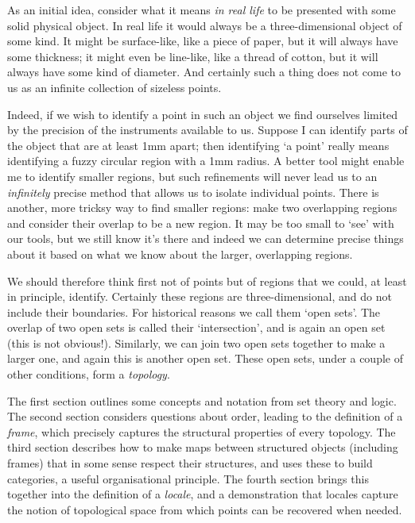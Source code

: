 \documentclass[oneside,english]{amsbook}
\numberwithin{section}{chapter}
\theoremstyle{plain}
\theoremstyle{definition}
\begin{document}
As an initial idea, consider what it means \emph{in real life} to be presented with some solid physical object. In real life it would always be a three-dimensional object of some kind. It might be surface-like, like a piece of paper, but it will always have some thickness; it might even be line-like, like a thread of cotton, but it will always have some kind of diameter. And certainly such a thing does not come to us as an infinite collection of sizeless points.

Indeed, if we wish to identify a point in such an object we find ourselves limited by the precision of the instruments available to us. Suppose I can identify parts of the object that are at least 1mm apart; then identifying `a point' really means identifying a fuzzy circular region with a 1mm radius. A better tool might enable me to identify smaller regions, but such refinements will never lead us to an \emph{infinitely} precise method that allows us to isolate individual points. There is another, more tricksy way to find smaller regions: make two overlapping regions and consider their overlap to be a new region. It may be too small to `see' with our tools, but we still know it's there and indeed we can determine precise things about it based on what we know about the larger, overlapping regions. 

We should therefore think first not of points but of regions that we could, at least in principle, identify. Certainly these regions are three-dimensional, and do not include their boundaries. For historical reasons we call them `open sets'. The overlap of two open sets is called their `intersection', and is again an open set (this is not obvious!). Similarly, we can join two open sets together to make a larger one, and again this is another open set. These open sets, under a couple of other conditions, form a \emph{topology}.

The first section outlines some concepts and notation from set theory and logic. The second section considers questions about order, leading to the definition of a \emph{frame}, which precisely captures the structural properties of every topology. The third section describes how to make maps between structured objects (including frames) that in some sense respect their structures, and uses these to build categories, a useful organisational principle. The fourth section brings this together into the definition of a \emph{locale}, and a demonstration that locales capture the notion of topological space from which points can be recovered when needed.
\end{document}
